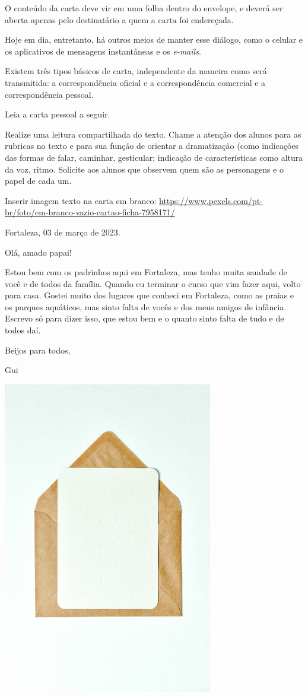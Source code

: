 \begin{itemize}
O conteúdo da carta deve vir em uma folha dentro do envelope, e deverá
ser aberta apenas pelo destinatário a quem a carta foi endereçada.

Hoje em dia, entretanto, há outros meios de manter esse diálogo, como o
celular e os aplicativos de mensagens instantâneas e os \emph{e-mails}.

Existem três tipos básicos de carta, independente da maneira como será
transmitida: a correspondência oficial e a correspondência comercial e a
correspondência pessoal.


Leia a carta pessoal a seguir.

Realize uma leitura compartilhada do texto. Chame a atenção dos alunos
para as rubricas no texto e para sua função de orientar a dramatização
(como indicações das formas de falar, caminhar, gesticular; indicação de
características como altura da voz, ritmo. Solicite aos alunos que
observem quem são as personagens e o papel de cada um.

Inserir imagem texto na carta em branco:
\url{https://www.pexels.com/pt-br/foto/em-branco-vazio-cartao-ficha-7958171/}

Fortaleza, 03 de março de 2023.

Olá, amado papai!

Estou bem com os padrinhos aqui em Fortaleza, mas tenho muita saudade de
você e de todos da família. Quando eu terminar o curso que vim fazer
aqui, volto para casa. Gostei muito dos lugares que conheci em
Fortaleza, como as praias e os parques aquáticos, mas sinto falta de
vocês e dos meus amigos de infância. Escrevo só para dizer isso, que
estou bem e o quanto sinto falta de tudo e de todos daí.

Beijos para todos,

Gui

\includegraphics[width=3.60417in,height=5.40625in]{media/image8.jpeg}


\end{itemize}
